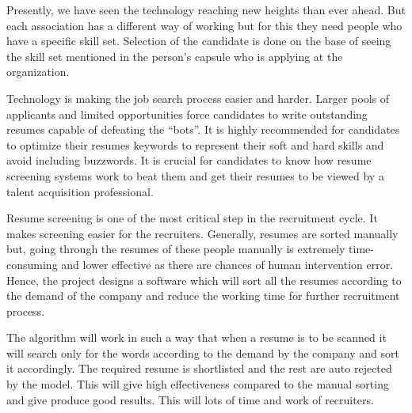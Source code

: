 \documentclass[12 pt, oneside]{book}
\begin{document}
Presently, we have seen the technology reaching new heights than ever ahead. But each association has a different way of working but for this they need people who have a specific skill set. Selection of the candidate is done on the base of seeing the skill set mentioned in the person's capsule who is applying at the organization. 
\newline
\par Technology is making the job search process easier and harder. Larger pools of applicants and limited opportunities force candidates to write outstanding resumes capable of defeating the “bots”. It is highly recommended for candidates to optimize their resumes keywords to represent their soft and hard skills and avoid including buzzwords. It is crucial for candidates to know how resume screening systems work to beat them and get their resumes to be viewed by a talent acquisition professional.
\newline
\par Resume screening is one of the most critical step in the recruitment cycle. It makes screening easier for the recruiters. Generally, resumes are sorted manually but, going through the resumes of these people manually is extremely time- consuming and lower effective as there are chances of human intervention error. Hence, the project designs a software which will sort all the resumes according to the demand of the company and reduce the working time for further recruitment process.

\par The algorithm will work in such a way that when a resume is to be scanned it will search only for the words according to the demand by the company and sort it accordingly. The required resume is shortlisted and the rest are auto rejected by the model. This will give high effectiveness compared to the manual sorting and give produce good results. This will lots of time and work of recruiters.
\end{document}
